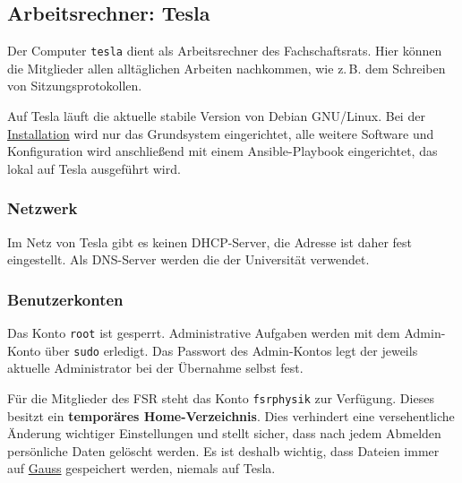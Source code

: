 \subsection{Arbeitsrechner: Tesla}
\label{tesla}
Der Computer \texttt{tesla} dient als Arbeitsrechner des Fachschaftsrats. Hier können die Mitglieder allen alltäglichen Arbeiten nachkommen, wie z.\,B. dem Schreiben von Sitzungsprotokollen.

Auf Tesla läuft die aktuelle stabile Version von Debian GNU/Linux. Bei der \hyperref[grundsystem-installieren]{Installation} wird nur das Grundsystem eingerichtet, alle weitere Software und Konfiguration wird anschließend mit einem Ansible-Playbook eingerichtet, das lokal auf Tesla ausgeführt wird.

\subsubsection{Netzwerk}
\label{tesla-netzwerk}
Im Netz von Tesla gibt es keinen DHCP-Server, die Adresse ist daher fest eingestellt. Als DNS-Server werden die der Universität verwendet.

\begin{config}
\end{config}

\subsubsection{Benutzerkonten}
\label{tesla-benutzer}
Das Konto \texttt{root} ist gesperrt. Administrative Aufgaben werden mit dem Admin-Konto über \texttt{sudo} erledigt. Das Passwort des Admin-Kontos legt der jeweils aktuelle Administrator bei der Übernahme selbst fest.

\begin{config}
\end{config}

Für die Mitglieder des FSR steht das Konto \texttt{fsrphysik} zur Verfügung. Dieses besitzt ein \textbf{temporäres Home-Verzeichnis}. Dies verhindert eine versehentliche Änderung wichtiger Einstellungen und stellt sicher, dass nach jedem Abmelden persönliche Daten gelöscht werden. Es ist deshalb wichtig, dass Dateien immer auf \hyperref[gauss]{Gauss} gespeichert werden, niemals auf Tesla.
\begin{config}
\end{config}

